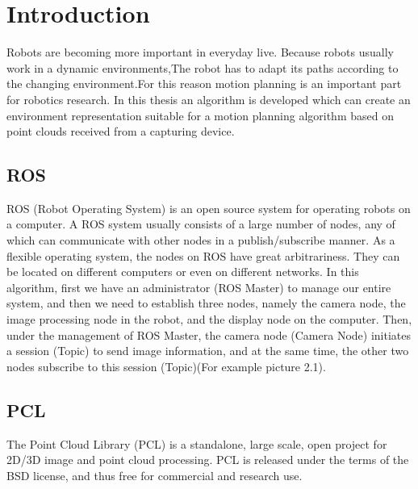\chapter{Introduction}
Robots are becoming more important in everyday live. Because robots usually work in  a dynamic environments,The robot has to adapt its paths according to the changing environment.For this reason motion planning is an important part for robotics research. In this thesis an algorithm is developed which can create an environment representation suitable for a motion planning algorithm based on point clouds received from a capturing device.
\section{ROS}
ROS (Robot Operating System) is an open source system for operating robots on a computer. A ROS system usually consists of a large number of nodes, any of which can communicate with other nodes in a publish/subscribe manner. As a flexible operating system, the nodes on ROS have great arbitrariness. They can be located on different computers or even on different networks.
In this algorithm, first we have an administrator (ROS Master) to manage our entire system, and then we need to establish three nodes, namely the camera node, the image processing node in the robot, and the display node on the computer. Then, under the management of ROS Master, the camera node (Camera Node) initiates a session (Topic) to send image information, and at the same time, the other two nodes subscribe to this session (Topic)(For example picture 2.1). 

\section{PCL}
The Point Cloud Library (PCL) is a standalone, large scale, open project for 2D/3D image and point cloud processing. PCL is released under the terms of the BSD license, and thus free for commercial and research use.

